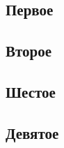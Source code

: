 \subsection*{Первое}


\subsection*{Второе}


\subsection*{Шестое}


\subsection*{Девятое}









